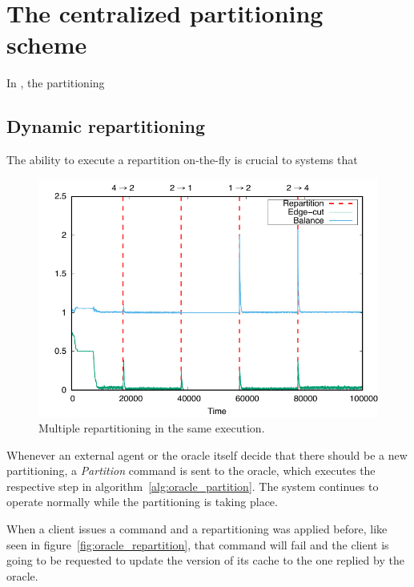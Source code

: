 \section{The centralized partitioning scheme}


In \appname, the partitioning 

\subsection{Dynamic repartitioning}
The ability to execute a repartition on-the-fly is crucial to systems that 

\begin{figure}
	\includegraphics[width=1.0\linewidth]{graphs/0.01_edgecuts/repartition/4-2-1-2-4/edge_cut_balance_max_4_part}
	\caption{Multiple repartitioning in the same execution.}
	\label{fig:repartition_4_times}
\end{figure}

Whenever an external agent or the oracle itself decide that there should be a new partitioning, a \emph{Partition} command is sent to the oracle, which executes the respective step in algorithm~\ref{alg:oracle_partition}. The system continues to operate normally while the partitioning is taking place.

When a client issues a command and a repartitioning was applied before, like seen in figure~\ref{fig:oracle_repartition}, that command will fail and the client is going to be requested to update the version of its cache to the one replied by the oracle.


